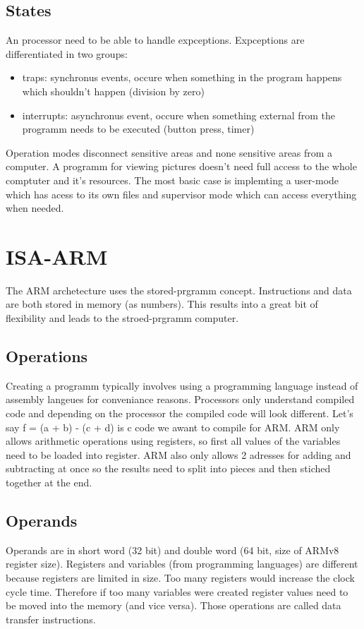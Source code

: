 \documentclass[a4paper]{scrartcl}
\begin{document}
        \subsection{States}
            An processor need to be able to handle expceptions. Expceptions are differentiated in two groups:
            \begin{itemize}
                \item traps: synchronus events, occure when something in the program happens which shouldn't happen (division by zero)
                \item interrupts: asynchronus event, occure when something external from the programm needs to be executed (button press, timer)
            \end{itemize}  
            Operation modes disconnect sensitive areas and none sensitive areas from a computer. A programm for viewing pictures doesn't need full access to the whole
            comptuter and it's resources. The most basic case is implemting a user-mode which has acess to its own files and supervisor mode which can access everything when needed.
            
    \section{ISA-ARM}
        The ARM archetecture uses the stored-prgramm concept. Instructions and data are both stored in memory (as numbers). This results into a great bit of flexibility and
        leads to the stroed-prgramm computer.
        \subsection{Operations}
            Creating a programm typically involves using a programming language instead of assembly langeues for conveniance reasons. Processors only understand compiled code and
            depending on the processor the compiled code will look different. Let's say f = (a + b) - (c + d) is c code we awant to compile for ARM. ARM only allows 
            arithmetic operations using registers, so first all values of the variables need to be loaded into register. ARM also only allows 2 adresses for adding and subtracting at once
            so the results need to split into pieces and then stiched together at the end. 
    
        \subsection{Operands}
            Operands are in short word (32 bit) and double word (64 bit, size of ARMv8 register size). Registers and variables (from programming languages) are different
            because registers are limited in size. Too many registers would increase the clock cycle time. %
            Therefore if too many variables were created register values need to be moved into the memory (and vice versa). Those operations are called data transfer instructions.
            
\end{document}

